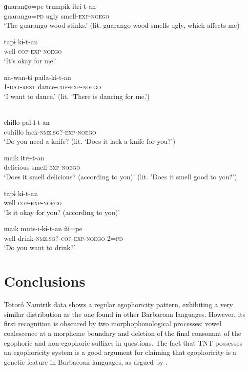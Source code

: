 \documentclass[output=paper]{langsci/langscibook}
\begin{document}
	\ex \label{ex:gg68b}
	\gll ɡuaranɡo=pe	trumpik	itri-t-an\\
	guarango=\textsc{pd} ugly smell-\textsc{exp-noego}\\
	\glt ‘The guarango wood stinks.’ (lit. guarango wood smells ugly, which affects me)
	
	\ex \label{ex:gg68c}
	\gll tapɨ kɨ-t-an\\
	well \textsc{cop-exp-noego}\\
	\glt ‘It’s okay for me.’
	
	\ex \label{ex:gg68d}
	\gll na-wan-tɨ paila-kɨ-t-an\\
	1-\textsc{dat-rest} dance-\textsc{cop-exp-noego}\\
	\glt ‘I want to dance.’ (lit. ‘There is dancing for me.’)
\z \z 


\ea
{}\\ 
	\ea \label{ex:gg69a}
	\gll chillo	pal-ɨ-t-an\\
	cuhillo	lack-\textsc{nmz.sg?-exp-noego}\\
	\glt ‘Do you need a knife? (lit. ‘Does it lack a knife for you?’)
	
	\ex \label{ex:gg69b}
	\gll maik itrɨ-t-an\\
	delicious smell-\textsc{exp-noego}\\
	\glt ‘Does it smell delicious? (according to you)’ (lit. 'Does it smell good to you?')
	
	\ex \label{ex:gg69c}
	\gll tapɨ kɨ-t-an\\
	well \textsc{cop-exp-noego}\\
	\glt ‘Is it okay for you? (according to you)’
	
	\ex \label{ex:gg69d}
	\gll maik muts-i-kɨ-t-an ñi=pe\\
	well drink-\textsc{nmz.sg?-cop-exp-noego} 2=\textsc{pd}\\
	\glt ‘Do you want to drink?’
\z \z


\section{Conclusions}\label{s:gg6}

Totoró Namtrik data shows a regular egophoricity pattern, exhibiting a very similar distribution as the one found in other Barbacoan languages. However, its first recognition is obscured by two morphophonological processes: vowel coalescence at a morpheme boundary and deletion of the final consonant of the egophoric and non-egophoric suffixes in questions. The fact that TNT possesses an egophoricity system is a good argument for claiming that egophoricity is a genetic feature in Barbacoan languages, as argued by \citet{CurnowLiddicoat1998}. 
\end{document}

